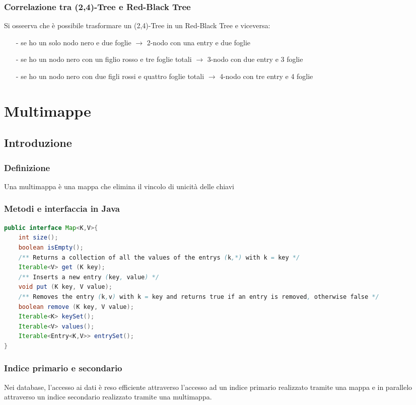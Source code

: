 \documentclass[a4paper]{article}
\begin{document}
\subsubsection*{Correlazione tra (2,4)-Tree e Red-Black Tree}
Si osseerva che è possibile trasformare un (2,4)-Tree in un Red-Black Tree e viceversa:
\begin{itemize}[topsep=3pt, itemsep=0pt]
	\item[-] se ho un solo nodo nero e due foglie \(\rightarrow\) 2-nodo con una entry e due foglie
	\item[-] se ho un nodo nero con un figlio rosso e tre foglie totali \(\rightarrow\) 3-nodo con due entry e 3 foglie
	\item[-] se ho un nodo nero con due figli rossi e quattro foglie totali \(\rightarrow\) 4-nodo con tre entry e 4 foglie
\end{itemize}

\newpage

\section{Multimappe}
\subsection{Introduzione}
\subsubsection*{Definizione}
Una multimappa è una mappa che elimina il vincolo di unicità delle chiavi

\subsubsection*{Metodi e interfaccia in Java}
\begin{lstlisting}[language=Java]
public interface Map<K,V>{
	int size();
	boolean isEmpty();
	/** Returns a collection of all the values of the entrys (k,*) with k = key */
	Iterable<V> get (K key);
	/** Inserts a new entry (key, value) */
	void put (K key, V value);
	/** Removes the entry (k,v) with k = key and returns true if an entry is removed, otherwise false */
	boolean remove (K key, V value);
	Iterable<K> keySet();
	Iterable<V> values();
	Iterable<Entry<K,V>> entrySet();
}
\end{lstlisting}

\subsubsection*{Indice primario e secondario}
Nei database, l'accesso ai dati è reso efficiente attraverso l'accesso ad un indice primario realizzato tramite una mappa e
in parallelo attraverso un indice secondario realizzato tramite una multimappa.
\end{document}
